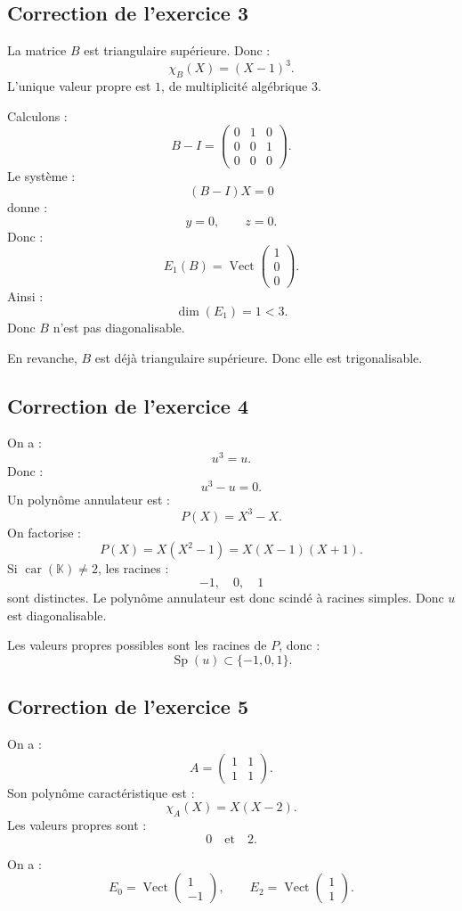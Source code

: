 \documentclass[11pt,a4paper]{article}
\newcommand{\K}{\mathbb K}
\newcommand{\Vect}{\operatorname{Vect}}
\newcommand{\Sp}{\operatorname{Sp}}
\begin{document}
\subsection*{Correction de l'exercice 3}

La matrice \(B\) est triangulaire supérieure. Donc :
\[
\chi_B(X)=(X-1)^3.
\]
L'unique valeur propre est \(1\), de multiplicité algébrique \(3\).

Calculons :
\[
B-I=
\begin{pmatrix}
0&1&0\\
0&0&1\\
0&0&0
\end{pmatrix}.
\]
Le système :
\[
(B-I)X=0
\]
donne :
\[
y=0,\qquad z=0.
\]
Donc :
\[
E_1(B)=\Vect
\begin{pmatrix}
1\\0\\0
\end{pmatrix}.
\]
Ainsi :
\[
\dim(E_1)=1<3.
\]
Donc \(B\) n'est pas diagonalisable.

En revanche, \(B\) est déjà triangulaire supérieure.  
Donc elle est trigonalisable.

\subsection*{Correction de l'exercice 4}

On a :
\[
u^3=u.
\]
Donc :
\[
u^3-u=0.
\]
Un polynôme annulateur est :
\[
P(X)=X^3-X.
\]
On factorise :
\[
P(X)=X(X^2-1)=X(X-1)(X+1).
\]
Si \(\operatorname{car}(\K)\neq2\), les racines :
\[
-1,\quad0,\quad1
\]
sont distinctes.  
Le polynôme annulateur est donc scindé à racines simples.  
Donc \(u\) est diagonalisable.

Les valeurs propres possibles sont les racines de \(P\), donc :
\[
\Sp(u)\subset\{-1,0,1\}.
\]

\subsection*{Correction de l'exercice 5}

On a :
\[
A=
\begin{pmatrix}
1&1\\
1&1
\end{pmatrix}.
\]
Son polynôme caractéristique est :
\[
\chi_A(X)=X(X-2).
\]
Les valeurs propres sont :
\[
0\quad\text{et}\quad2.
\]

On a :
\[
E_0=\Vect
\begin{pmatrix}
1\\-1
\end{pmatrix},
\qquad
E_2=\Vect
\begin{pmatrix}
1\\1
\end{pmatrix}.
\]
\end{document}

